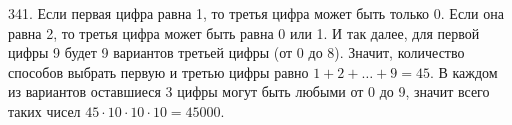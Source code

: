 341. Если первая цифра равна 1, то третья цифра может быть только 0. Если она равна 2, то третья цифра может быть равна 0 или 1. И так далее, для первой цифры 9 будет 9 вариантов третьей цифры (от 0 до 8). Значит, количество способов выбрать первую и третью цифры равно $1+2+\ldots+9=45.$ В каждом из вариантов оставшиеся 3 цифры могут быть любыми от 0 до 9, значит всего таких чисел $45\cdot10\cdot10\cdot10=45000.$\\
